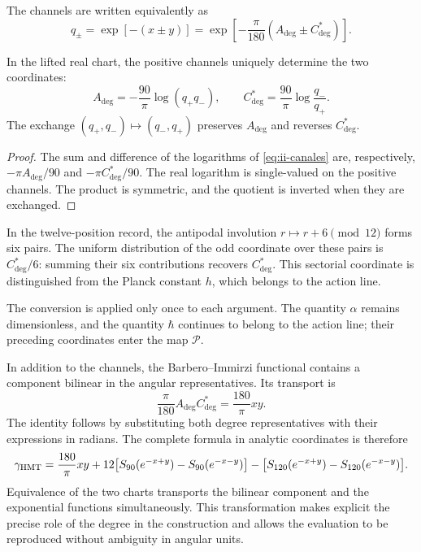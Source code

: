 The channels are written equivalently as
\begin{equation}
 q_\pm=\exp[-(x\pm y)]
 =\exp\!\left[-\frac{\pi}{180}(A_{\deg}\pm C^*_{\deg})\right].
\label{eq:ii-canales}
\end{equation}
\begin{proposition}
\label{prop:ii-inversion-canales-angulares}
In the lifted real chart, the positive channels uniquely
determine the two coordinates:
\[
 A_{\deg}=-\frac{90}{\pi}\log(q_+q_-),\qquad
 C^*_{\deg}=\frac{90}{\pi}\log\frac{q_-}{q_+}.
\]
The exchange \((q_+,q_-)\mapsto(q_-,q_+)\) preserves
\(A_{\deg}\) and reverses \(C^*_{\deg}\).
\end{proposition}
\begin{proof}
The sum and difference of the logarithms of
\eqref{eq:ii-canales} are, respectively,
\(-\pi A_{\deg}/90\) and \(-\pi C^*_{\deg}/90\).
The real logarithm is single-valued on the positive channels.
The product is symmetric, and the quotient is inverted when they are exchanged.
\end{proof}
In the twelve-position record, the antipodal involution
\(r\mapsto r+6\pmod {12}\) forms six pairs. The uniform
distribution of the odd coordinate over these pairs is
\(C^*_{\deg}/6\): summing their six contributions recovers
\(C^*_{\deg}\). This sectorial coordinate is distinguished from
the Planck constant \(h\), which belongs to the action line.

The conversion is applied only once to each argument. The quantity
\(\alpha\) remains dimensionless, and the quantity \(\hbar\)
continues to belong to the action line; their preceding coordinates
enter the map \(\mathcal P\).

In addition to the channels, the Barbero--Immirzi functional contains a
component bilinear in the angular representatives. Its transport is
\begin{equation}
 \frac{\pi}{180}A_{\deg}C^*_{\deg}
 =\frac{180}{\pi}xy.
 \label{eq:ii-barbero-cartas}
\end{equation}
The identity follows by substituting both degree representatives
with their expressions in radians. The complete formula in analytic
coordinates is therefore
\[
 \gamma_{\mathrm{HMT}}
 =\frac{180}{\pi}xy
 +12\bigl[S_{90}(e^{-x+y})-S_{90}(e^{-x-y})\bigr]
 -\bigl[S_{120}(e^{-x+y})-S_{120}(e^{-x-y})\bigr].
\]
Equivalence of the two charts transports the bilinear component
and the exponential functions simultaneously. This transformation
makes explicit the precise role of the degree in the construction and allows
the evaluation to be reproduced without ambiguity in angular units.

